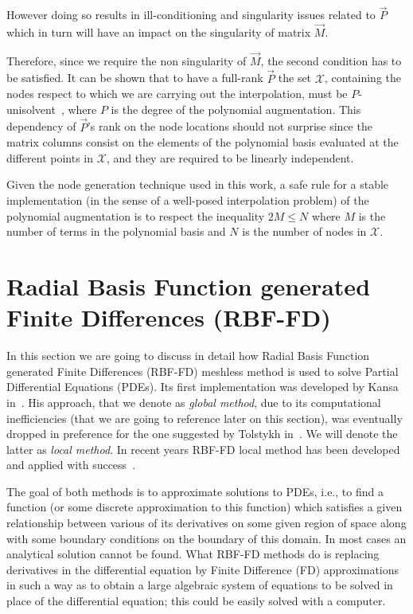 However doing so results in ill-conditioning and singularity issues related to $\vec{P}$ which in turn will have an impact on the singularity of matrix $\vec{M}$.

Therefore, since we require the non singularity of $\vec{M}$, the second condition has to be satisfied. It can be shown that to have a full-rank $\vec{P}$ the set $\mathcal{X}$, containing the nodes respect to which we are carrying out the interpolation, must be $P$-unisolvent~\cite{Fasshauer:details_on_basic_functions}, where $P$ is the degree of the polynomial augmentation. This dependency of $\vec{P}$'s rank on the node locations should not surprise since the matrix columns consist on the elements of the polynomial basis evaluated at the different points in $\mathcal{X}$, and they are required to be linearly independent.

Given the node generation technique used in this work, a safe rule for a stable implementation (in the sense of a well-posed interpolation problem) of the polynomial augmentation is to respect the inequality $2M \le N$ where $M$ is the number of terms in the polynomial basis and $N$ is the number of nodes in $\mathcal{X}$.



\section{Radial Basis Function generated Finite Differences (RBF-FD)}
\label{sec:RBF-FD}

In this section we are going to discuss in detail how Radial Basis Function generated Finite Differences (RBF-FD) meshless method is used to solve Partial Differential Equations (PDEs). Its first implementation was developed by Kansa in~\cite{Kansa:RBF_1,Kansa:RBF_2}. His approach, that we denote as \emph{global method}, due to its computational inefficiencies (that we are going to reference later on this section), was eventually dropped in preference for the one suggested by Tolstykh in~\cite{Tolstykh:RBF_local}. We will denote the latter as \emph{local method}. In recent years RBF-FD local method has been developed and applied with success~\cite{Bueno:RBF-FD_application_1,Bueno:RBF-FD_application_2,Kosec:RBF-FD_application_3,Kosec:RBF-FD_application_4}.

The goal of both methods is to approximate solutions to PDEs, i.e., to find a function (or some discrete approximation to this function) which satisfies a given relationship between various of its derivatives on some given region of space along with some boundary conditions on the boundary of this domain. In most cases an analytical solution cannot be found.
What RBF-FD methods do is replacing derivatives in the differential equation by Finite Difference (FD) approximations in such a way as to obtain a large algebraic system of equations to be solved in place of the differential equation; this could be easily solved with a computer.


